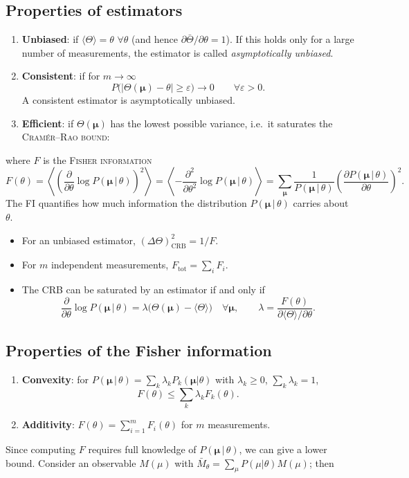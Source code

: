 \documentclass[11pt,a4paper]{article}
\newcommand{\boxedeq}[1]{%
  \par\vspace{0.4\baselineskip}%
  {\centering\keybox{$\displaystyle #1$}\par}%
  \vspace{0.4\baselineskip}}
\newcommand{\expval}[1]{\langle #1\rangle}
\newcommand{\est}{\Theta}                 %
\newcommand{\vmu}{\bm{\mu}}               %
\newcommand{\Pmu}{P(\vmu\,|\,\theta)}
\newcommand{\term}[1]{\textsc{#1}}
\begin{document}
\subsection{Properties of estimators}
\begin{enumerate}[label=(\roman*)]
  \item \textbf{Unbiased}: if $\expval{\est}=\theta$ $\forall\theta$ (and hence $\partial\bar\est/\partial\theta=1$).
        If this holds only for a large number of measurements, the estimator is called \emph{asymptotically unbiased}.
  \item \textbf{Consistent}: if for $m\to\infty$
        \[ P\bigl(|\est(\vmu)-\theta|\geq\varepsilon\bigr) \to 0 \qquad \forall\varepsilon>0 . \]
        A consistent estimator is asymptotically unbiased.
  \item \textbf{Efficient}: if $\est(\vmu)$ has the lowest possible variance, i.e.\ it saturates the \term{Cramér--Rao bound}:
        \boxedeq{(\Delta\est)^2 \geq \frac{\bigl|\partial\bar\est/\partial\theta\bigr|^2}{F(\theta)}}
\end{enumerate}
where $F$ is the \term{Fisher information}
\[
  F(\theta) = \left\langle\left(\frac{\partial}{\partial\theta}\log\Pmu\right)^2\right\rangle
  = \left\langle -\frac{\partial^2}{\partial\theta^2}\log\Pmu\right\rangle
  = \sum_{\vmu}\frac{1}{\Pmu}\left(\frac{\partial\Pmu}{\partial\theta}\right)^2 .
\]
The FI quantifies how much information the distribution $\Pmu$ carries about $\theta$.
\begin{itemize}
  \item For an unbiased estimator, $(\Delta\est)^2_{\text{CRB}} = 1/F$.
  \item For $m$ independent measurements, $F_{\text{tot}}=\sum_i F_i$.
  \item The CRB can be saturated by an estimator if and only if
        \[
          \frac{\partial}{\partial\theta}\log\Pmu = \lambda\bigl(\est(\vmu)-\expval{\est}\bigr)\quad\forall\vmu,
          \qquad \lambda = \frac{F(\theta)}{\partial\expval{\est}/\partial\theta}.
        \]
\end{itemize}

\subsection{Properties of the Fisher information}
\begin{enumerate}[label=(\alph*)]
  \item \textbf{Convexity}: for $\Pmu=\sum_k\lambda_k P_k(\vmu|\theta)$ with $\lambda_k\geq0$, $\sum_k\lambda_k=1$,
        \[ F(\theta) \leq \sum_k\lambda_k F_k(\theta). \]
  \item \textbf{Additivity}: $F(\theta)=\sum_{i=1}^m F_i(\theta)$ for $m$ measurements.
\end{enumerate}
Since computing $F$ requires full knowledge of $\Pmu$, we can give a lower bound. Consider an observable $M(\mu)$ with $\bar M_\theta=\sum_\mu P(\mu|\theta)M(\mu)$; then
\boxedeq{F(\theta) \geq \frac{1}{(\Delta M)^2}\left(\frac{d\bar M}{d\theta}\right)^2}
\end{document}

